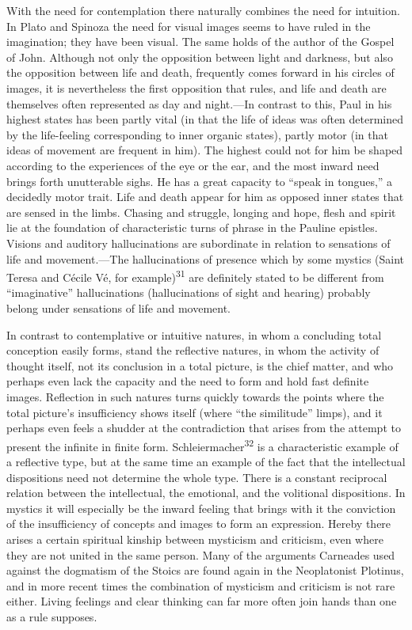 \documentclass[12pt,a4paper]{book}
\newcommand{\opage}[1]{\marginnote{\footnotesize\textit{[#1]}}}
\begin{document}
With the need for contemplation there naturally combines the need for intuition.
In Plato and Spinoza the need for visual images seems to have ruled in the
imagination; they have been visual. The same holds of the author of the Gospel of
John. Although not only the opposition between light and darkness, but also the
opposition between life and death, frequently comes forward in his circles of
images, it is nevertheless the first opposition that rules, and life and death
are themselves often represented as day and night.---In contrast to this, Paul in
his highest states has been partly vital (in that the life of ideas was often
determined by the life-feeling corresponding to inner organic states), partly
motor (in that ideas of movement are frequent in him). The highest could not for
him be shaped according to the experiences of the eye or the ear, and the most
inward need brings forth unutterable sighs. He has a great capacity to ``speak in
tongues,'' a decidedly motor trait. Life and death appear for him as 
\opage{77}opposed inner
states that are sensed in the limbs. Chasing and struggle, longing and hope, flesh
and spirit lie at the foundation of characteristic turns of phrase in the Pauline
epistles. Visions and auditory hallucinations are subordinate in relation to
sensations of life and movement.---The hallucinations of presence which by some
mystics (Saint Teresa and Cécile Vé, for
example)\textsuperscript{31} are definitely stated to be different from
``imaginative'' hallucinations (hallucinations of sight and hearing) probably
belong under sensations of life and movement.

In contrast to contemplative or intuitive natures, in whom a concluding total
conception easily forms, stand the reflective natures, in whom the activity of
thought itself, not its conclusion in a total picture, is the chief matter, and
who perhaps even lack the capacity and the need to form and hold fast definite
images. Reflection in such natures turns quickly towards the points where the
total picture's insufficiency shows itself (where ``the similitude'' limps), and
it perhaps even feels a shudder at the contradiction that arises from the attempt
to present the infinite in finite form. Schleiermacher\textsuperscript{32} is a
characteristic example of a reflective type, but at the same time an example of
the fact that the intellectual dispositions need not determine the whole type.
There is a constant reciprocal relation between the intellectual, the emotional,
and the volitional dispositions. In mystics it will especially be the inward
feeling that brings with it the conviction of the insufficiency of concepts and
images to form an expression. Hereby there arises a certain spiritual kinship
between mysticism and criticism, even where they are not united in the same
person. Many of the arguments Carneades used against the dogmatism of the Stoics
are found again in the Neoplatonist Plotinus, and in more recent times the
combination of mysticism and criticism is not rare either. Living feelings and
clear thinking can far more often join hands than one as a rule supposes.
\end{document}
